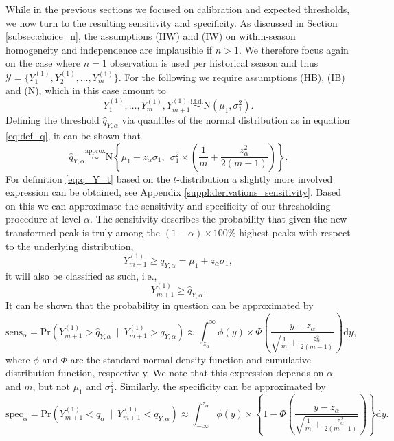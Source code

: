\documentclass[12pt]{article}
\begin{document}
While in the previous sections we focused on calibration and expected thresholds, we now turn to the resulting sensitivity and specificity. As discussed in Section \ref{subsec:choice_n}, the assumptions (HW) and (IW) on within-season homogeneity and independence are implausible if $n > 1$. We therefore focus again on the case where $n = 1$ observation is used per historical season and thus $\mathcal{Y} = \{Y_1^{(1)}, Y_2^{(1)}, \dots, Y_m^{(1)}\}$. For the following we require assumptions (HB), (IB) and (N), which in this case amount to
$$
Y_1^{(1)}, \dots, Y_m^{(1)}, Y_{m + 1}^{(1)} \stackrel{\text{i.i.d.}}{\sim} \text{N}(\mu_1, \sigma^2_1).
$$
Defining the threshold $\hat{q}_{Y, \alpha}$ via quantiles of the normal distribution as in equation \eqref{eq:def_q}, it can be shown that
\begin{equation}
\hat{q}_{Y, \alpha} \stackrel{\text{approx}}{\sim} \text{N}\left\{\mu_1 + z_\alpha \sigma_1,\ \ \sigma_1^2 \times \left(\frac{1}{m} + \frac{z_\alpha^2}{2(m - 1)} \right) \right\}.
\label{eq:q_Y}
\end{equation}
For definition \eqref{eq:q_Y_t} based on the $t$-distribution a slightly more involved expression can be obtained, see Appendix \ref{suppl:derivations_sensitivity}. Based on this we can approximate the sensitivity and specificity of our thresholding procedure at level $\alpha$. The sensitivity describes the probability that given the new transformed peak is truly among the $(1 - \alpha) \times 100\%$ highest peaks with respect to the underlying distribution,
$$
Y_{m + 1}^{(1)} \geq q_{Y, \alpha} = \mu_1 + z_\alpha \sigma_1,
$$
it will also be classified as such, i.e.,
$$
Y_{m + 1}^{(1)} \geq \hat{q}_{Y, \alpha}.
$$
It can be shown that the probability in question can be approximated by
\begin{equation}
\text{sens}_\alpha = \text{Pr}\left(Y_{m + 1}^{(1)} > \hat{q}_{Y, \alpha} \ \mid \ Y_{m + 1}^{(1)} > q_{Y, \alpha}\right) \approx \int_{z_\alpha}^\infty \phi(y) \times \Phi\left(\frac{y - z_\alpha}{\sqrt{\frac{1}{m} + \frac{z_\alpha^2}{2(m - 1)}}}\right) \text{d}y,
\label{eq:sens}
\end{equation}
where $\phi$ and $\Phi$ are the standard normal density function and cumulative distribution function, respectively. We note that this expression depends on $\alpha$ and $m$, but not $\mu_1$ and $\sigma^2_1$. Similarly, the specificity can be approximated by
\begin{equation}
\text{spec}_\alpha = \text{Pr}\left(Y_{m + 1}^{(1)} < \hat{q}_\alpha \ \mid \ Y_{m + 1}^{(1)} < q_{Y, \alpha}\right) \approx \int_{-\infty}^{z_\alpha}\phi(y) \times \left\{1 - \Phi\left(\frac{y - z_\alpha}{\sqrt{\frac{1}{m} + \frac{z_\alpha^2}{2(m - 1)}}}\right)\right\} \text{d}y.
\label{eq:spec}
\end{equation}
\end{document}

